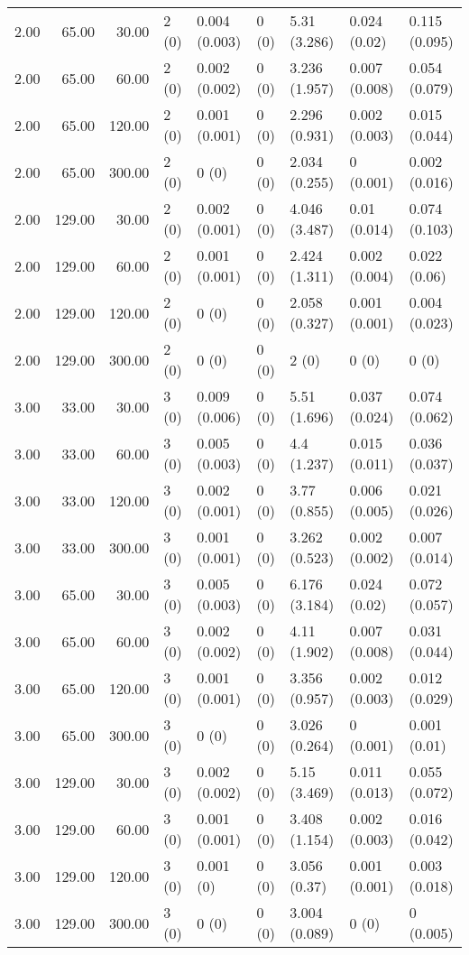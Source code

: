\begin{table}[ht]
\begin{tabular}{rrrllllll}
  2.00 & 65.00 & 30.00 & 2 (0) & 0.004 (0.003) & 0 (0) & 5.31 (3.286) & 0.024 (0.02) & 0.115 (0.095) \\ 
  2.00 & 65.00 & 60.00 & 2 (0) & 0.002 (0.002) & 0 (0) & 3.236 (1.957) & 0.007 (0.008) & 0.054 (0.079) \\ 
  2.00 & 65.00 & 120.00 & 2 (0) & 0.001 (0.001) & 0 (0) & 2.296 (0.931) & 0.002 (0.003) & 0.015 (0.044) \\ 
  2.00 & 65.00 & 300.00 & 2 (0) & 0 (0) & 0 (0) & 2.034 (0.255) & 0 (0.001) & 0.002 (0.016) \\ 
  2.00 & 129.00 & 30.00 & 2 (0) & 0.002 (0.001) & 0 (0) & 4.046 (3.487) & 0.01 (0.014) & 0.074 (0.103) \\ 
  2.00 & 129.00 & 60.00 & 2 (0) & 0.001 (0.001) & 0 (0) & 2.424 (1.311) & 0.002 (0.004) & 0.022 (0.06) \\ 
  2.00 & 129.00 & 120.00 & 2 (0) & 0 (0) & 0 (0) & 2.058 (0.327) & 0.001 (0.001) & 0.004 (0.023) \\ 
  2.00 & 129.00 & 300.00 & 2 (0) & 0 (0) & 0 (0) & 2 (0) & 0 (0) & 0 (0) \\ 
  3.00 & 33.00 & 30.00 & 3 (0) & 0.009 (0.006) & 0 (0) & 5.51 (1.696) & 0.037 (0.024) & 0.074 (0.062) \\ 
  3.00 & 33.00 & 60.00 & 3 (0) & 0.005 (0.003) & 0 (0) & 4.4 (1.237) & 0.015 (0.011) & 0.036 (0.037) \\ 
  3.00 & 33.00 & 120.00 & 3 (0) & 0.002 (0.001) & 0 (0) & 3.77 (0.855) & 0.006 (0.005) & 0.021 (0.026) \\ 
  3.00 & 33.00 & 300.00 & 3 (0) & 0.001 (0.001) & 0 (0) & 3.262 (0.523) & 0.002 (0.002) & 0.007 (0.014) \\ 
  3.00 & 65.00 & 30.00 & 3 (0) & 0.005 (0.003) & 0 (0) & 6.176 (3.184) & 0.024 (0.02) & 0.072 (0.057) \\ 
  3.00 & 65.00 & 60.00 & 3 (0) & 0.002 (0.002) & 0 (0) & 4.11 (1.902) & 0.007 (0.008) & 0.031 (0.044) \\ 
  3.00 & 65.00 & 120.00 & 3 (0) & 0.001 (0.001) & 0 (0) & 3.356 (0.957) & 0.002 (0.003) & 0.012 (0.029) \\ 
  3.00 & 65.00 & 300.00 & 3 (0) & 0 (0) & 0 (0) & 3.026 (0.264) & 0 (0.001) & 0.001 (0.01) \\ 
  3.00 & 129.00 & 30.00 & 3 (0) & 0.002 (0.002) & 0 (0) & 5.15 (3.469) & 0.011 (0.013) & 0.055 (0.072) \\ 
  3.00 & 129.00 & 60.00 & 3 (0) & 0.001 (0.001) & 0 (0) & 3.408 (1.154) & 0.002 (0.003) & 0.016 (0.042) \\ 
  3.00 & 129.00 & 120.00 & 3 (0) & 0.001 (0) & 0 (0) & 3.056 (0.37) & 0.001 (0.001) & 0.003 (0.018) \\ 
  3.00 & 129.00 & 300.00 & 3 (0) & 0 (0) & 0 (0) & 3.004 (0.089) & 0 (0) & 0 (0.005) \\ 
   \hline
\end{tabular}
\end{table}
